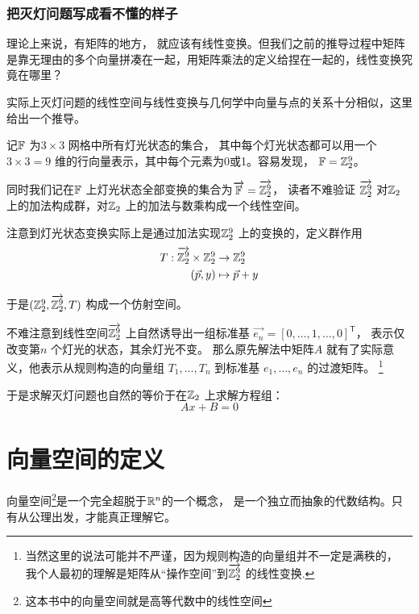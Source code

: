 \subsubsection{把灭灯问题写成看不懂的样子}
理论上来说，有矩阵的地方，
就应该有线性变换。但我们之前的推导过程中矩阵是靠无理由的多个向量拼凑在一起，用矩阵乘法的定义给捏在一起的，线性变换究竟在哪里？

实际上灭灯问题的线性空间与线性变换与几何学中向量与点的关系十分相似，这里给出一个推导。

记\(\mathbb{F}\) 为\(3 \times 3\) 网格中所有灯光状态的集合，
其中每个灯光状态都可以用一个\(3 \times 3=9\) 维的行向量表示，其中每个元素为0或1。容易发现，
\(\mathbb{F}=\mathbb{Z}_{2}^{9}\)。

同时我们记在\(\mathbb{F}\)
上灯光状态全部变换的集合为\(\overrightarrow{\mathbb{F}}=\overrightarrow{\mathbb{Z}_{2}^{9}}\)，
读者不难验证 \(\overrightarrow{\mathbb{Z}_{2}^{9}}\)
对\(\mathbb{Z}_{2}\)上的加法构成群，对\(\mathbb{Z}_{2}\) 上的加法与数乘构成一个线性空间。

注意到灯光状态变换实际上是通过加法实现\(\mathbb{Z}^{9}_{2}\) 上的变换的，定义群作用
\begin{align*}
    T: \overrightarrow{\mathbb{Z}_{2}^{9}} \times
    \mathbb{Z}_{2}^{9} &\to \mathbb{Z}_{2}^{9}\\
    (\vec{p},y) &\mapsto \vec{p}+y
\end{align*}

于是\((\mathbb{Z}^{9}_{2}, \overrightarrow{\mathbb{Z}^{9}_{2}}, T)\) 构成一个仿射空间。

不难注意到线性空间\(\overrightarrow{\mathbb{Z}^{9}_{2}}\) 上自然诱导出一组标准基
\(\overrightarrow{e_{n}}=[0,\dots,1,\dots,0]^{\mathsf{T}}\)，
表示仅改变第\(n\) 个灯光的状态，其余灯光不变。 那么原先解法中矩阵\(A\) 就有了实际意义，他表示从规则构造的向量组
\({T_{1}, \dots, T_{n}}\) 到标准基 \({e_{1}, \dots, e_{n}}\) 的过渡矩阵。
\footnote{当然这里的说法可能并不严谨，因为规则构造的向量组并不一定是满秩的，
我个人最初的理解是矩阵从``操作空间''到\(\overrightarrow{\mathbb{Z}^{9}_{2}}\) 的线性变换.}

于是求解灭灯问题也自然的等价于在\(\mathbb{Z}_{2}\) 上求解方程组：
\[
    Ax+B=0
\]

\section{向量空间的定义}
向量空间\footnote{这本书中的向量空间就是高等代数中的线性空间}是一个完全超脱于\(\mathbb{R}^{n}\)的一个概念，
是一个独立而抽象的代数结构。只有从公理出发，才能真正理解它。

